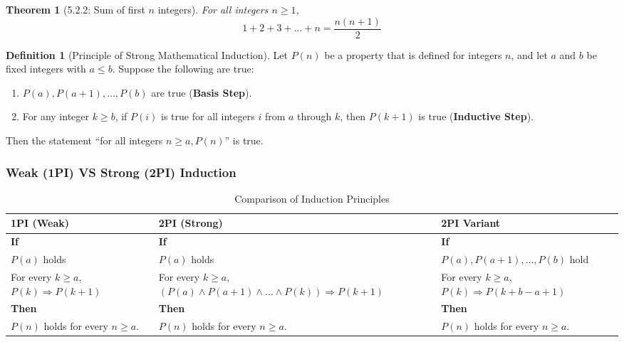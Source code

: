 \documentclass{article}
\theoremstyle{plain}
\newtheorem{theorem}{Theorem}[section]
\theoremstyle{definition}
\newtheorem*{definition}{Definition}
\theoremstyle{remark}
\begin{document}
\begin{theorem}[5.2.2: Sum of first $n$ integers]
    For all integers $n \geq 1$,
    \[ 1 + 2 + 3 + \dots + n = \frac{n(n+1)}{2} \]
\end{theorem}

\begin{definition}[Principle of Strong Mathematical Induction]
    Let $P(n)$ be a property that is defined for integers $n$, and let $a$ and $b$ be fixed integers with $a \leq b$. Suppose the following are true:
    \begin{enumerate}[label=\arabic*.]
        \item $P(a), P(a+1), \dots, P(b)$ are true (\textbf{Basis Step}).
        \item For any integer $k \geq b$, if $P(i)$ is true for all integers $i$ from $a$ through $k$, then $P(k+1)$ is true (\textbf{Inductive Step}).
    \end{enumerate}
    Then the statement ``for all integers $n \geq a, P(n)$'' is true.
\end{definition}

\subsubsection{Weak (1PI) VS Strong (2PI) Induction}

\begin{table}[h]
    \centering
    \begin{tabular}{p{} p{} p{}}
        \toprule
        \textbf{1PI (Weak)} & \textbf{2PI (Strong)} & \textbf{2PI Variant} \\
        \midrule
        \textbf{If} & \textbf{If} & \textbf{If} \\
        $P(a)$ holds & $P(a)$ holds & $P(a), P(a+1), \dots, P(b)$ hold \\
        \addlinespace
        For every $k \geq a$, \newline $P(k) \Rightarrow P(k+1)$ & For every $k \geq a$, \newline $(P(a) \wedge P(a+1) \wedge \dots \wedge P(k)) \Rightarrow P(k+1)$ & For every $k \geq a$, \newline $P(k) \Rightarrow P(k+b-a+1)$ \\
        \addlinespace
        \textbf{Then} & \textbf{Then} & \textbf{Then} \\
        $P(n)$ holds for every $n \geq a$. & $P(n)$ holds for every $n \geq a$. & $P(n)$ holds for every $n \geq a$. \\
        \bottomrule
    \end{tabular}
    \caption{Comparison of Induction Principles}
    \label{tab:induction_types}
\end{table}
\end{document}
